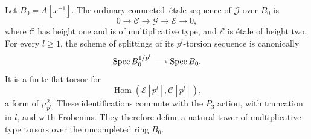 \begin{lemma}\label{h3:lem:ordinary-torsor}
Let $B_0=A[x^{-1}]$.  The ordinary connected--\'etale sequence
of $\mathcal G$ over $B_0$ is
\[
 0\longrightarrow\mathcal C\longrightarrow\mathcal G
 \longrightarrow\mathcal E\longrightarrow0,
\]
where $\mathcal C$ has height one and is of multiplicative
type, and $\mathcal E$ is \'etale of height two.
For every $l\geq1$, the scheme of splittings of its
$p^l$-torsion sequence is canonically
\begin{equation}\label{h3:geom:ordinary-root-torsor}
 \operatorname{Spec} B_0^{1/p^l}\longrightarrow\operatorname{Spec} B_0.
\end{equation}
It is a finite flat torsor for
\[
 \operatorname{Hom}(\mathcal E[p^l],\mathcal C[p^l]),
\]
a form of $\mu_{p^l}^2$.  These identifications commute
with the $P_3$ action, with truncation in $l$, and with
Frobenius.  They therefore define a natural tower of
multiplicative-type torsors over the uncompleted ring $B_0$.
\end{lemma}

